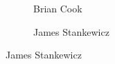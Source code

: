 \begin{frame}[plain]
\begin{figure}[h]
\begin{subfigure}{0.3\textwidth}
	\caption{Brian Cook}
	\end{subfigure}
	\begin{subfigure}{0.3\textwidth}
	\captionsetup{labelformat=empty}
	\centering
	\caption{James Stankewicz}
	\end{subfigure}
	\end{figure}
\end{frame}



